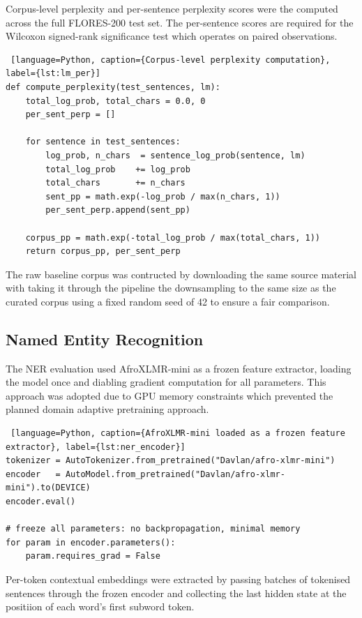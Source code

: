 \documentclass[11pt,a4paper]{article}
\begin{document}
Corpus-level perplexity and per-sentence perplexity scores were the computed across the full FLORES-200 test set. The per-sentence scores are required for the Wilcoxon signed-rank significance test which operates on paired observations.

\begin{lstlisting} [language=Python, caption={Corpus-level perplexity computation}, label={lst:lm_per}]
def compute_perplexity(test_sentences, lm):
    total_log_prob, total_chars = 0.0, 0
    per_sent_perp = []
 
    for sentence in test_sentences:
        log_prob, n_chars  = sentence_log_prob(sentence, lm)
        total_log_prob    += log_prob
        total_chars       += n_chars
        sent_pp = math.exp(-log_prob / max(n_chars, 1))
        per_sent_perp.append(sent_pp)
 
    corpus_pp = math.exp(-total_log_prob / max(total_chars, 1))
    return corpus_pp, per_sent_perp
\end{lstlisting}

The raw baseline corpus was contructed by downloading the same source material with taking it through the pipeline the downsampling to the same size as the curated corpus using a fixed random seed of 42 to ensure a fair comparison.

\subsection{Named Entity Recognition}
The NER evaluation used AfroXLMR-mini \citep{alabi-etal-2022-adapting} as a frozen feature extractor, loading the model once and diabling gradient computation for all parameters. This approach was adopted due to GPU memory constraints which prevented the planned domain adaptive pretraining approach.

\begin{lstlisting} [language=Python, caption={AfroXLMR-mini loaded as a frozen feature extractor}, label={lst:ner_encoder}]
tokenizer = AutoTokenizer.from_pretrained("Davlan/afro-xlmr-mini")
encoder   = AutoModel.from_pretrained("Davlan/afro-xlmr-mini").to(DEVICE)
encoder.eval()
 
# freeze all parameters: no backpropagation, minimal memory
for param in encoder.parameters():
    param.requires_grad = False
\end{lstlisting}

Per-token contextual embeddings were extracted by passing batches of tokenised sentences through the frozen encoder and collecting the last hidden state at the positiion of each word's first subword token.
\end{document}
